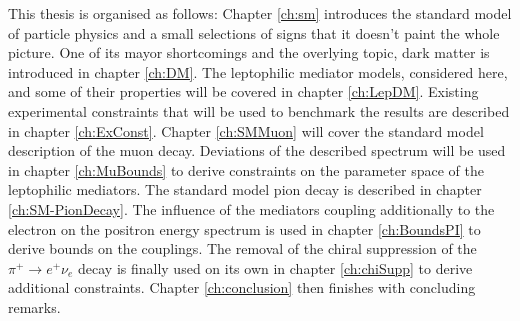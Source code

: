 This thesis is organised as follows:
Chapter \ref{ch:sm} introduces the standard model of particle physics and a small selections of signs that it doesn't paint the whole picture. One of its mayor shortcomings and the overlying topic, dark matter is introduced in chapter \ref{ch:DM}. The leptophilic mediator models, considered here, and some of their properties will be covered in chapter \ref{ch:LepDM}. Existing experimental constraints that will be used to benchmark the results are described in chapter \ref{ch:ExConst}. Chapter \ref{ch:SMMuon} will cover the standard model description of the muon decay. Deviations of the described spectrum will be used in chapter \ref{ch:MuBounds} to derive constraints on the parameter space of the leptophilic mediators. The standard model pion decay is described in chapter \ref{ch:SM-PionDecay}. The influence of the mediators coupling additionally to the electron on the positron energy spectrum is used in chapter \ref{ch:BoundsPI} to derive bounds on the couplings. The removal of the chiral suppression of the $\pi^+\rightarrow e^+ \nu_e$ decay is finally used on its own in chapter \ref{ch:chiSupp} to derive additional constraints. Chapter \ref{ch:conclusion} then finishes with concluding remarks.